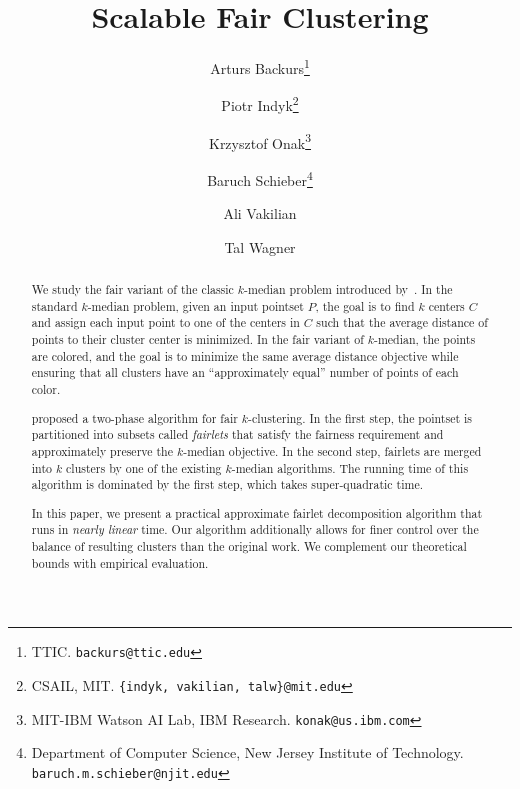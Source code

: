 \documentclass[11pt]{article}
\title{Scalable Fair Clustering}
\author{
Arturs Backurs\thanks{TTIC. {\tt backurs@ttic.edu}} 
\and
Piotr Indyk\thanks{CSAIL, MIT. {\tt\{indyk, vakilian, talw\}@mit.edu}}
\and
Krzysztof Onak\thanks{MIT-IBM Watson AI Lab, IBM Research. {\tt konak@us.ibm.com}}
\and
Baruch Schieber\thanks{Department of Computer Science, New Jersey Institute of Technology. {\tt baruch.m.schieber@njit.edu}}
\and
Ali Vakilian\footnotemark[2]
\and
Tal Wagner\footnotemark[2]
}
\begin{document}
\setlength{\abovedisplayskip}{3pt}
\setlength{\belowdisplayskip}{3pt}

\thispagestyle{empty}%
\setcounter{page}{0}

\date{}
\maketitle{}
\setcounter{page}{1}%
%

\begin{abstract}
We study the fair variant of the classic $k$-median problem introduced by~\cite{chierichetti2017fair}. In the standard $k$-median problem, given an input pointset $P$, the goal is to find $k$ centers $C$ and assign each input point to one of the centers in $C$ such that the average distance of points to their cluster center is minimized.
 In the fair variant of $k$-median, the points are colored, and the goal is to minimize the same average distance objective while ensuring that all clusters have an ``approximately equal'' number of points of each color. 

\cite{chierichetti2017fair} proposed a two-phase algorithm for fair $k$-clustering. In the first step, the pointset is partitioned into subsets called {\em fairlets} that satisfy the fairness requirement and approximately preserve the $k$-median objective. In the second step,  fairlets are merged into $k$ clusters by one of the existing $k$-median algorithms. The running time of this algorithm is dominated by the first step, which takes super-quadratic time. 

In this paper, we present a practical approximate fairlet decomposition algorithm that runs in {\em nearly linear} time. Our algorithm additionally allows for finer control over the balance of resulting clusters than the original work. We complement our theoretical bounds with empirical evaluation.
\end{abstract}






\end{document}
